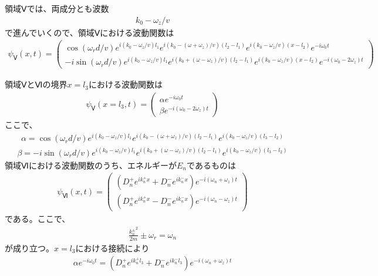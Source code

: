 領域Ⅴでは、両成分とも波数
\begin{align}
k_{0}-\omega_{z}/v
\end{align}
で進んでいくので、領域Ⅴにおける波動関数は
\begin{align}
{\psi}_{Ⅴ}(x,t)=
\begin{pmatrix}
\cos(\omega_{r}d/v)e^{i(k_{0}-\omega_{z}/v)l_{1}}e^{i(k_{0}-(\omega+\omega_{z})/v)(l_{2}-l_{1})}e^{i(k_{0}-\omega_{z}/v)(x-l_{2})}e^{-i\omega_{0}t} \\
-i\sin(\omega_{r}d/v)e^{i(k_{0}-\omega_{z}/v)l_{1}}e^{i(k_{0}+(\omega-\omega_{z})/v)(l_{2}-l_{1})}e^{i(k_{0}-\omega_{z}/v)(x-l_{2})}e^{-i(\omega_{0}-2\omega_{z})t}
\end{pmatrix}
\end{align}

$領域ⅤとⅥの境界x=l_{3}における波動関数は$
\begin{align}
{\psi}_{Ⅴ}(x=l_{3},t)=
\begin{pmatrix}
{\alpha}e^{-i\omega_{0}t} \\
{\beta}e^{-i(\omega_{0}-2\omega_{z})t}
\end{pmatrix}
\end{align}
ここで、
\begin{align}
{\alpha}=\cos\left(\omega_{r}d/v\right)e^{i(k_{0}-\omega_{z}/v)l_{1}}e^{i\left(k_{0}-(\omega+\omega_{z})/v\right)(l_{2}-l_{1})}e^{i\left(k_{0}-\omega_{z}/v\right)(l_{3}-l_{2})}
\end{align}
\begin{align}
{\beta}=-i\sin\left(\omega_{r}d/v\right)e^{i(k_{0}-\omega_{z}/v)l_{1}}e^{i\left(k_{0}+(\omega-\omega_{z})/v\right)(l_{2}-l_{1})}e^{i\left(k_{0}-\omega_{z}/v\right)(l_{3}-l_{2})}
\end{align}
$領域Ⅵにおける波動関数のうち、エネルギーがE_{n}であるものは$
\begin{align}
{\psi}_{Ⅵ}(x,t)=
\begin{pmatrix}
(D_{n}^{+}e^{ik_{n}^{+}x}+D_{n}^{-}e^{ik_{n}^{-}x} )e^{-i(\omega_{n}+\omega_{z})t}\\
(D_{n}^{+}e^{ik_{n}^{+}x}-D_{n}^{-}e^{ik_{n}^{-}x} )e^{-i(\omega_{n}-\omega_{z})t}
\end{pmatrix}
\end{align}
である。ここで、
\begin{align}
\frac{{k_{n}^{\pm}}^2}{2m}{\pm}\omega_{r}=\omega_{n}
\end{align}
$が成り立つ。x=l_{3}における接続により$
\begin{align}
{\alpha}e^{-i\omega_{0}t}=\left(D_{n}^{+}e^{ik_{n}^{+}l_{3}}+D_{n}^{-}e^{ik_{n}^{-}l_{3}}\right)e^{-i\left(\omega_{n}+\omega_{z}\right)t}
\end{align}
